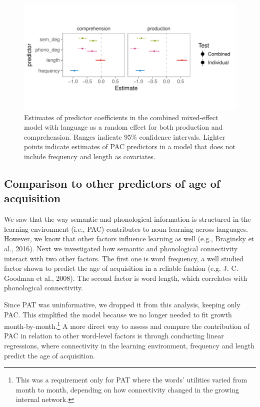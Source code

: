 \documentclass[english,floatsintext,man]{apa6}
\theoremstyle{definition}
\theoremstyle{definition}
\theoremstyle{definition}
\theoremstyle{remark}
\begin{document}
\begin{figure}[!h]
\includegraphics[width=\textwidth]{figs/plot_static_preds_all} \caption{Estimates of predictor coefficients in the combined mixed-effect model with language as a random effect for both production and comprehension. Ranges indicate 95\% confidence intervals. Lighter points indicate estimates of PAC predictors in a model that does not include frequency and length as covariates.}\label{fig:staticAll}
\end{figure}

\subsection{Comparison to other predictors of age of
acquisition}\label{comparison-to-other-predictors-of-age-of-acquisition}

We saw that the way semantic and phonological information is structured
in the learning environment (i.e., PAC) contributes to noun learning
across languages. However, we know that other factors influence learning
as well (e.g., Braginsky et al., 2016). Next we investigated how
semantic and phonological connectivity interact with two other factors.
The first one is word frequency, a well studied factor shown to predict
the age of acquisition in a reliable fashion (e.g. J. C. Goodman et al.,
2008). The second factor is word length, which correlates with
phonological connectivity.

Since PAT was uninformative, we dropped it from this analysis, keeping
only PAC. This simplified the model because we no longer needed to fit
growth
month-by-month.\footnote{This was a requirement only for PAT where the words' utilities varied from month to month, depending on how connectivity changed in the growing internal network.}
A more direct way to assess and compare the contribution of PAC in
relation to other word-level factors is through conducting linear
regressions, where connectivity in the learning environment, frequency
and length predict the age of acquisition.
\end{document}
